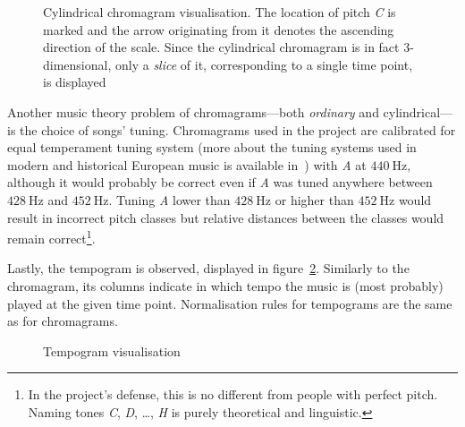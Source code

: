\documentclass[conference, a4paper, 12pt]{IEEEtran}
\begin{document}
    \par

    \begin{figure}[tbhp!]
        \centering
        
        \caption[Cylindrical chromagram visualisation]{Cylindrical chromagram visualisation. The location of pitch \emph{C} is marked and the arrow originating from it denotes the ascending direction of the scale. Since the cylindrical chromagram is in fact $ 3 $-dimensional, only a \emph{slice} of it, corresponding to a single time point, is displayed}
        \label{fig:cylindrical_chromagram_visualisation}
    \end{figure}

    \par

    Another music theory problem of chromagrams---both \emph{ordinary} and cylindrical---is the choice of songs' tuning. Chromagrams used in the project are calibrated for equal temperament tuning system (more about the tuning systems used in modern and historical European music is available in~\cite{bib:Sikic2013}) with \emph{A} at $ \SI{440}{\hertz} $, although it would probably be correct even if \emph{A} was tuned anywhere between $ \SI{428}{\hertz} $ and $ \SI{452}{\hertz} $. Tuning \emph{A} lower than $ \SI{428}{\hertz} $ or higher than $ \SI{452}{\hertz} $ would result in incorrect pitch classes but relative distances between the classes would remain correct\footnote{In the project's defense, this is no different from people with perfect pitch. Naming tones \emph{C}, \emph{D}, {\ldots}, \emph{H} is purely theoretical and linguistic.}.

    \par

    Lastly, the tempogram is observed, displayed in figure~\ref{fig:tempogram_visualisation}. Similarly to the chromagram, its columns indicate in which tempo the music is (most probably) played at the given time point. Normalisation rules for tempograms are the same as for chromagrams.

    \par

    \begin{figure}[tbhp!]
        \centering
        
        \caption{Tempogram visualisation}
        \label{fig:tempogram_visualisation}
    \end{figure}

    \par
\end{document}
